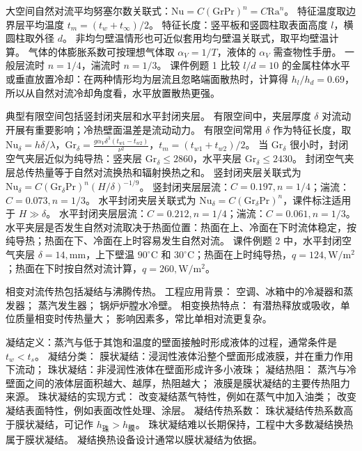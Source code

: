 
大空间自然对流平均努塞尔数关联式：$\mathrm{Nu}=C(\mathrm{Gr}\mathrm{Pr})^n=C\mathrm{Ra}^n$。
特征温度取边界层平均温度 $t_m=(t_w+t_\infty)/2$。
特征长度：竖平板和竖圆柱取表面高度 $l$，横圆柱取外径 $d$。
非均匀壁温情形也可近似套用均匀壁温关联式，取平均壁温计算。
气体的体膨胀系数可按理想气体取 $\alpha_V=1/T$，液体的 $\alpha_V$ 需查物性手册。
一般层流时 $n=1/4$，湍流时 $n=1/3$。
课件例题 1 比较 $l/d=10$ 的金属柱体水平或垂直放置冷却：在两种情形均为层流且忽略端面散热时，计算得 $h_l/h_d=0.69$，所以从自然对流冷却角度看，水平放置散热更强。


典型有限空间包括竖封闭夹层和水平封闭夹层。
有限空间中，夹层厚度 $\delta$ 对流动开展有重要影响；冷热壁面温差是流动动力。
有限空间常用 $\delta$ 作为特征长度，取 $\mathrm{Nu}_\delta=h\delta/\lambda$，$\mathrm{Gr}_\delta=\frac{g\alpha_V\delta^3(t_{w1}-t_{w2})}{\nu^2}$，$t_m=(t_{w1}+t_{w2})/2$。
当 $\mathrm{Gr}_\delta$ 很小时，封闭空气夹层近似为纯导热：竖夹层 $\mathrm{Gr}_\delta\le2860$，水平夹层 $\mathrm{Gr}_\delta\le2430$。
封闭空气夹层总传热量等于自然对流换热和辐射换热之和。
竖封闭夹层关联式为 $\mathrm{Nu}_\delta=C(\mathrm{Gr}_\delta\mathrm{Pr})^n(H/\delta)^{-1/9}$。
竖封闭夹层层流：$C=0.197,n=1/4$；湍流：$C=0.073,n=1/3$。
水平封闭夹层关联式为 $\mathrm{Nu}_\delta=C(\mathrm{Gr}_\delta\mathrm{Pr})^n$，课件标注适用于 $H\gg\delta$。
水平封闭夹层层流：$C=0.212,n=1/4$；湍流：$C=0.061,n=1/3$。
水平夹层是否发生自然对流取决于热面位置：热面在上、冷面在下时流体稳定，按纯导热；热面在下、冷面在上时容易发生自然对流。
课件例题 2 中，水平封闭空气夹层 $\delta=14,\mathrm{mm}$，上下壁温 $90^\circ\mathrm{C}$ 和 $30^\circ\mathrm{C}$；热面在上时纯导热，$q=124,\mathrm{W/m^2}$；热面在下时按自然对流计算，$q=260,\mathrm{W/m^2}$。

\divider



相变对流传热包括凝结与沸腾传热。
工程应用背景：
空调、冰箱中的冷凝器和蒸发器；
蒸汽发生器；
锅炉炉膛水冷壁。
相变换热特点：
有潜热释放或吸收，单位质量相变时传热量大；
影响因素多，常比单相对流更复杂。


凝结定义：蒸汽与低于其饱和温度的壁面接触时形成液体的过程，通常条件是 $t_w<t_s$。
凝结分类：
膜状凝结：浸润性液体沿整个壁面形成液膜，并在重力作用下流动；
珠状凝结：非浸润性液体在壁面形成许多小液珠；
凝结热阻：
蒸汽与冷壁面之间的液体层面积越大、越厚，热阻越大；
液膜是膜状凝结的主要传热阻力来源。
珠状凝结的实现方式：
改变凝结蒸气特性，例如在蒸气中加入油类；
改变凝结表面特性，例如表面改性处理、涂层。
凝结传热系数：
珠状凝结传热系数高于膜状凝结，可记作 $h_{\mathrm{珠}}>h_{\mathrm{膜}}$。
珠状凝结难以长期保持，工程中大多数凝结换热属于膜状凝结。
凝结换热设备设计通常以膜状凝结为依据。


